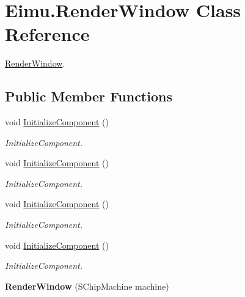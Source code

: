 \hypertarget{class_eimu_1_1_render_window}{
\section{Eimu.RenderWindow Class Reference}
\label{class_eimu_1_1_render_window}
}


\hyperlink{class_eimu_1_1_render_window}{RenderWindow}.  


\subsection*{Public Member Functions}
\begin{DoxyCompactItemize}
\item 
void \hyperlink{class_eimu_1_1_render_window_a01e32a44c7f54344cab43cfa47a60b7b}{InitializeComponent} ()
\begin{DoxyCompactList}\small\item\em InitializeComponent. \item\end{DoxyCompactList}\item 
void \hyperlink{class_eimu_1_1_render_window_a01e32a44c7f54344cab43cfa47a60b7b}{InitializeComponent} ()
\begin{DoxyCompactList}\small\item\em InitializeComponent. \item\end{DoxyCompactList}\item 
void \hyperlink{class_eimu_1_1_render_window_a01e32a44c7f54344cab43cfa47a60b7b}{InitializeComponent} ()
\begin{DoxyCompactList}\small\item\em InitializeComponent. \item\end{DoxyCompactList}\item 
void \hyperlink{class_eimu_1_1_render_window_a01e32a44c7f54344cab43cfa47a60b7b}{InitializeComponent} ()
\begin{DoxyCompactList}\small\item\em InitializeComponent. \item\end{DoxyCompactList}\item 
\hypertarget{class_eimu_1_1_render_window_a8066310139fa3c2365b755c35efc7a1b}{
{\bfseries RenderWindow} (SChipMachine machine)}
\label{class_eimu_1_1_render_window_a8066310139fa3c2365b755c35efc7a1b}

\end{DoxyCompactItemize}


